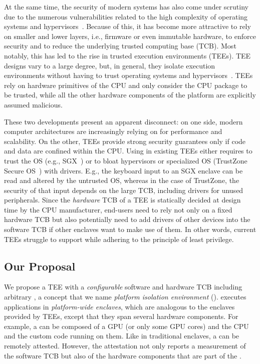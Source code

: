 At the same time, the security of modern systems has also come under scrutiny due to the numerous vulnerabilities related to the high complexity of operating systems and hypervisors~\cite{checkoway2013iago,suzaki2011memory}.
Because of this, it has become more attractive to rely on smaller and lower layers, i.e., firmware or even immutable hardware, to enforce security and to reduce the underlying trusted computing base (TCB).
Most notably, this has led to the rise in trusted execution environments (TEEs). 
TEE designs vary to a large degree, but, in general, they isolate execution environments without having to trust operating systems and hypervisors~\cite{costan2016intel,winter2008trusted,costan2016sanctum}. TEEs rely on hardware primitives of the CPU and only consider the CPU package to be trusted, while all the other hardware components of the platform are explicitly assumed malicious. 

These two developments present an apparent disconnect: on one side, modern computer architectures are increasingly relying on \sphw for performance and scalability. On the other, TEEs provide strong security guarantees only if code and data are confined within the CPU.
Using \sphw in existing TEEs either requires to trust the OS (e.g., SGX~\cite{costan2016intel}) or to bloat hypervisors or specialized OS (TrustZone Secure OS~\cite{TZOS}) with drivers. E.g., the keyboard input to an SGX enclave can be read and altered by the untrusted OS, whereas in the case of TrustZone, the security of that input depends on the large TCB, including drivers for unused peripherals. Since the \emph{hardware} TCB of a TEE is statically decided at design time by the CPU manufacturer, end-users need to rely not only on a fixed hardware TCB but also potentially need to add drivers of other devices into the software TCB if other enclaves want to make use of them. In other words, current TEEs struggle to support \sphw while adhering to the principle of least privilege.


\subsection{Our Proposal}

We propose a TEE with a \emph{configurable} software and hardware TCB including arbitrary \sphw, a concept that we name \emph{platform isolation environment} (\name). \name executes applications in \emph{platform-wide enclaves}, which are analogous to the enclaves provided by TEEs, except that they span several hardware components. For example, a \nameenclave{} can be composed of a GPU (or only some GPU cores) and the CPU and the custom code running on them. Like in traditional enclaves, a \nameenclave{} can be remotely attested. However, the \name attestation not only reports a measurement of the software TCB but also of the hardware components that are part of the \nameenclave{}.

